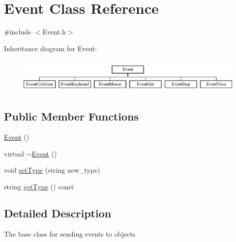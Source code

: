 \hypertarget{class_event}{\section{Event Class Reference}
\label{class_event}
}


{\ttfamily \#include $<$Event.\+h$>$}

Inheritance diagram for Event\+:\begin{figure}[H]
\begin{center}
\leavevmode
\includegraphics[height=1.744548cm]{class_event}
\end{center}
\end{figure}
\subsection*{Public Member Functions}
\begin{DoxyCompactItemize}
\item 
\hyperlink{class_event_a5a40dd4708297f7031e29b39e039ae10}{Event} ()
\item 
virtual \hyperlink{class_event_a7704ec01ce91e673885792054214b3d2}{$\sim$\+Event} ()
\item 
void \hyperlink{class_event_a6eb2f305445ab6d86e64acaacf145ab2}{set\+Type} (string new\+\_\+type)
\item 
string \hyperlink{class_event_a33f3769ef82c06a638a2640a4fe0fef3}{get\+Type} () const 
\end{DoxyCompactItemize}


\subsection{Detailed Description}
The base class for sending events to objects 

